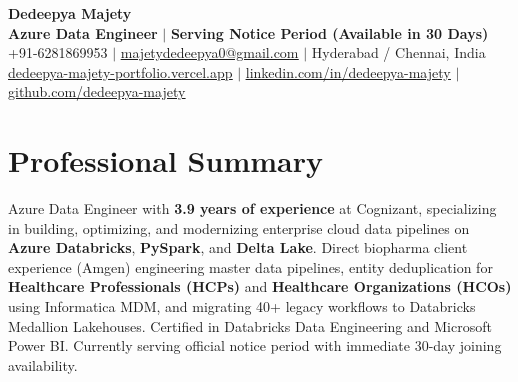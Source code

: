 \documentclass[letterpaper,10pt]{article}
\begin{document}
\begin{center}
    {\Huge \bfseries \color{primaryAccent} Dedeepya Majety} \\ \vspace{2pt}
    \textbf{Azure Data Engineer} $\vert$ \textbf{Serving Notice Period (Available in 30 Days)} \\ \vspace{2pt}
    \small +91-6281869953 $\vert$ \href{mailto:majetydedeepya0@gmail.com}{\underline{majetydedeepya0@gmail.com}} $\vert$ Hyderabad / Chennai, India \\ \vspace{1.5pt}
    \href{https://dedeepya-majety-portfolio.vercel.app}{\underline{dedeepya-majety-portfolio.vercel.app}} $\vert$ \href{https://linkedin.com/in/dedeepya-majety}{\underline{linkedin.com/in/dedeepya-majety}} $\vert$ \href{https://github.com/dedeepya-majety}{\underline{github.com/dedeepya-majety}}
\end{center}
\vspace{-8pt}

\section{Professional Summary}
\small{
Azure Data Engineer with \textbf{3.9 years of experience} at Cognizant, specializing in building, optimizing, and modernizing enterprise cloud data pipelines on \textbf{Azure Databricks}, \textbf{PySpark}, and \textbf{Delta Lake}. Direct biopharma client experience (Amgen) engineering master data pipelines, entity deduplication for \textbf{Healthcare Professionals (HCPs)} and \textbf{Healthcare Organizations (HCOs)} using Informatica MDM, and migrating 40+ legacy workflows to Databricks Medallion Lakehouses. Certified in Databricks Data Engineering and Microsoft Power BI. Currently serving official notice period with immediate 30-day joining availability.
}
\vspace{-2pt}

\end{document}
